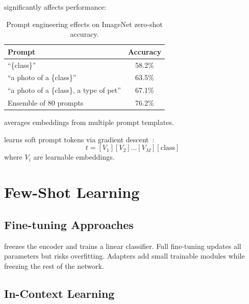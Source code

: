 
 significantly affects performance:

\begin{table}
\centering
\begin{tabular}{lc}
\toprule
\textbf{Prompt} & \textbf{Accuracy} \\
\midrule
``\{class\}'' & 58.2\% \\
``a photo of a \{class\}'' & 63.5\% \\
``a photo of a \{class\}, a type of pet'' & 67.1\% \\
Ensemble of 80 prompts & 76.2\% \\
\bottomrule
\end{tabular}
\caption{Prompt engineering effects on ImageNet zero-shot accuracy.}
\label{tab:prompt_engineering}
\end{table}

 averages embeddings from multiple prompt templates.

 learns soft prompt tokens via gradient descent~\cite{Zhou2022CoOp}:
\begin{equation}
    t = [V_1][V_2]\ldots[V_M][\text{class}]
\end{equation}
where $V_i$ are learnable embeddings.


\section{Few-Shot Learning}


\subsection{Fine-tuning Approaches}

 freezes the encoder and trains a linear classifier. Full fine-tuning updates all parameters but risks overfitting. Adapters add small trainable modules while freezing the rest of the network.

\subsection{In-Context Learning}

